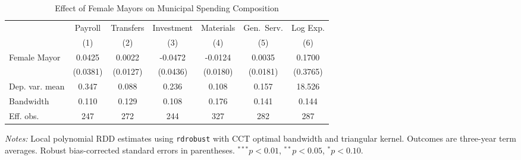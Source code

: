 \begin{table}[htbp]
\centering
\begin{threeparttable}
\caption{Effect of Female Mayors on Municipal Spending Composition}
\label{tab:main}
\footnotesize
\begin{tabular}{lcccccc}
\toprule
  & Payroll & Transfers & Investment & Materials & Gen.\ Serv. & Log Exp. \\
  & (1) & (2) & (3) & (4) & (5) & (6) \\
\midrule
Female Mayor & 0.0425 & 0.0022 & -0.0472 & -0.0124 & 0.0035 & 0.1700 \\
  & (0.0381) & (0.0127) & (0.0436) & (0.0180) & (0.0181) & (0.3765) \\
\midrule
Dep. var. mean & 0.347 & 0.088 & 0.236 & 0.108 & 0.157 & 18.526 \\
Bandwidth & 0.110 & 0.129 & 0.108 & 0.176 & 0.141 & 0.144 \\
Eff. obs. & 247 & 272 & 244 & 327 & 282 & 287 \\
\bottomrule
\end{tabular}
\begin{tablenotes}[flushleft]
\footnotesize
\item \textit{Notes:} Local polynomial RDD estimates using \texttt{rdrobust} with CCT optimal bandwidth and triangular kernel. Outcomes are three-year term averages. Robust bias-corrected standard errors in parentheses. $^{***}p<0.01$, $^{**}p<0.05$, $^{*}p<0.10$.
\end{tablenotes}
\end{threeparttable}
\end{table}
